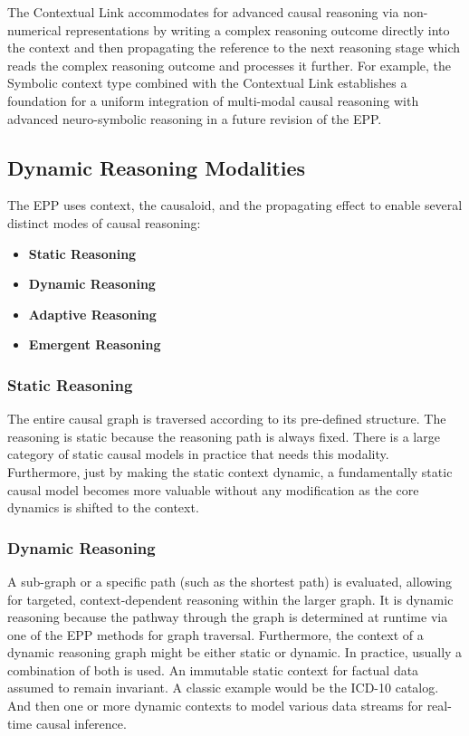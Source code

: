 The Contextual Link accommodates for advanced causal reasoning via non-numerical representations by writing a complex reasoning outcome directly into the context and then propagating the reference to the next reasoning stage which reads the complex reasoning outcome and processes it further. For example, the Symbolic context type combined with the Contextual Link establishes a foundation for a uniform integration of multi-modal causal reasoning with advanced neuro-symbolic reasoning in a future revision of the EPP.

  
%
%
\subsection{Dynamic Reasoning Modalities}
\label{sec:epp_dynamic_modalities}

  
The EPP uses context, the causaloid, and the propagating effect to enable several distinct modes of causal reasoning: 

\begin{itemize}	
	\item \textbf{Static Reasoning}
	\item \textbf{Dynamic Reasoning}
	\item \textbf{Adaptive Reasoning} 
	\item \textbf{Emergent Reasoning} 
\end{itemize}


\subsubsection{Static Reasoning}

The entire causal graph is traversed according to its pre-defined structure. The reasoning is static because the reasoning path is always fixed. There is a large category of static causal models in practice that needs this modality. Furthermore, just by making the static context dynamic, a fundamentally static causal model becomes more valuable without any modification as the core dynamics is shifted to the context.  

\subsubsection{Dynamic Reasoning}


A sub-graph or a specific path (such as the shortest path) is evaluated, allowing for targeted, context-dependent reasoning within the larger graph. It is dynamic reasoning because the pathway through the graph is determined at runtime via one of the EPP methods for graph traversal. Furthermore, the context of a dynamic reasoning graph might be either static or dynamic. In practice, usually a combination of both is used. An immutable static context for factual data assumed to remain invariant. A classic example would be the ICD-10 catalog. And then one or more dynamic contexts to model various data streams for real-time causal inference. 

